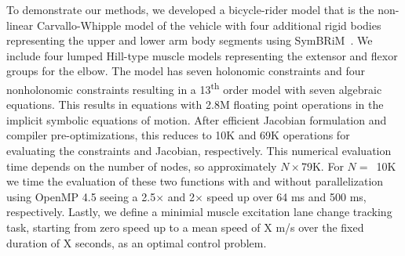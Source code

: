 \documentclass[11pt,twocolumn]{article}
\begin{document}
To demonstrate our methods, we developed a bicycle-rider model that is the
non-linear Carvallo-Whipple model of the vehicle with four additional rigid
bodies representing the upper and lower arm body segments using
SymBRiM~\cite{Stienstra2023a}. We include four lumped Hill-type muscle models
representing the extensor and flexor groups for the elbow. The model has seven
holonomic constraints and four nonholonomic constraints resulting in a
13\textsuperscript{th} order model with seven algebraic equations. This results
in equations with 2.8M floating point operations in the implicit symbolic
equations of motion. After efficient Jacobian formulation and compiler
pre-optimizations, this reduces to 10K and 69K operations for evaluating the
constraints and Jacobian, respectively. This numerical evaluation time depends
on the number of nodes, so approximately \(N\times\)79K. For \(N=\)~10K we time
the evaluation of these two functions with and without parallelization using
OpenMP 4.5 seeing a 2.5\(\times\) and 2\(\times\) speed up over 64 ms and 500
ms, respectively. Lastly, we define a minimial muscle excitation lane change
tracking task, starting from zero speed up to a mean speed of X m/s over the
fixed duration of X seconds, as an optimal control problem.


\vspace{-1em}
\end{document}
